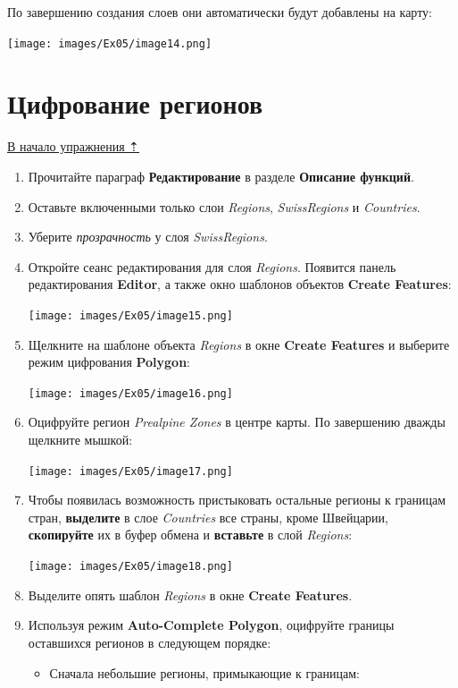 \documentclass[12pt,]{book}
\begin{document}
По завершению создания слоев они автоматически будут добавлены на карту:

\texttt{[image: images/Ex05/image14.png]}

\hypertarget{map-ref-general-digitizing}{%
\section{Цифрование регионов}\label{map-ref-general-digitizing}}

\protect\hyperlink{map-ref-general}{В начало упражнения ⇡}

\begin{enumerate}
\def\labelenumi{\arabic{enumi}.}
\item
  Прочитайте параграф \textbf{Редактирование} в разделе \textbf{Описание функций}.
\item
  Оставьте включенными только слои \emph{Regions}, \emph{SwissRegions} и \emph{Countries}.
\item
  Уберите \emph{прозрачность} у слоя \emph{SwissRegions}.
\item
  Откройте сеанс редактирования для слоя \emph{Regions}. Появится панель редактирования \textbf{Editor}, а также окно шаблонов объектов \textbf{Create Features}:

  \texttt{[image: images/Ex05/image15.png]}
\item
  Щелкните на шаблоне объекта \emph{Regions} в окне \textbf{Create Features} и выберите режим цифрования \textbf{Polygon}:

  \texttt{[image: images/Ex05/image16.png]}
\item
  Оцифруйте регион \emph{Prealpine Zones} в центре карты. По завершению дважды щелкните мышкой:

  \texttt{[image: images/Ex05/image17.png]}
\item
  Чтобы появилась возможность пристыковать остальные регионы к границам стран, \textbf{выделите} в слое \emph{Countries} все страны, кроме Швейцарии, \textbf{скопируйте} их в буфер обмена и \textbf{вставьте} в слой \emph{Regions}:

  \texttt{[image: images/Ex05/image18.png]}
\item
  Выделите опять шаблон \emph{Regions} в окне \textbf{Create Features}.
\item
  Используя режим \textbf{Auto-Complete Polygon}, оцифруйте границы оставшихся регионов в следующем порядке:

  \begin{itemize}
  \item
    Сначала небольшие регионы, примыкающие к границам:


\end{itemize}
\end{enumerate}
\end{document}

